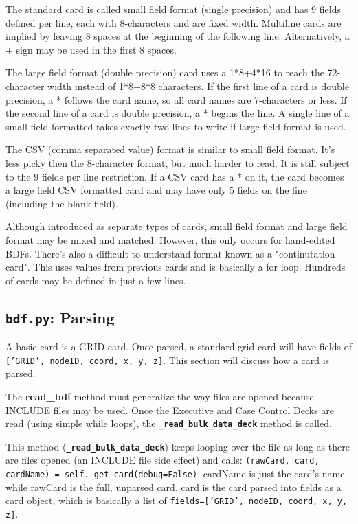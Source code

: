      The standard card is called small field format (single precision) and has 9 fields defined per line, each with 8-characters and are fixed width.  Multiline cards are implied by leaving 8 spaces at the beginning of the following line.  Alternatively, a + sign may be used in the first 8 spaces.

     The large field format (double precision) card uses a 1*8+4*16 to reach the 72-character width instead of 1*8+8*8 characters.  If the first line of a card is double precision, a * follows the card name, so all card names are 7-characters or less.  If the second line of a card is double precision, a * begins the line.  A single line of a small field formatted takes exactly two lines to write if large field format is used.

     The CSV (comma separated value) format is similar to small field format.  It's less picky then the 8-character format, but much harder to read.  It is still subject to the 9 fields per line restriction.  If a CSV card has a * on it, the card becomes a large field CSV formatted card and may have only 5 fields on the line (including the blank field).

     Although introduced as separate types of cards, small field format and large field format may be mixed and matched.  However, this only occurs for hand-edited BDFs.  There's also a difficult to understand format known as a "continutation card".  This uses values from previous cards and is basically a for loop.  Hundreds of cards may be defined in just a few lines.

 \subsection{{\tt bdf.py}: Parsing}
     A basic card is a GRID card.  Once parsed, a standard grid card will have fields of {\tt ['GRID', nodeID, coord, x, y, z]}.  This section will discuss how a card is parsed.

     The {\bf read_bdf} method must generalize the way files are opened because INCLUDE files may be used.  Once the Executive and Case Control Decks are read (using simple while loops), the {\bf \tt \_read\_bulk\_data\_deck} method is called.

     This method ({\bf \tt \_read\_bulk\_data\_deck}) keeps looping over the file as long as there are files opened (an INCLUDE file side effect) and calls:
     {\tt (rawCard, card, cardName) = self.\_get\_card(debug=False)}.  cardName is just the card's name, while rawCard is the full, unparsed card.  card is the card parsed into fields as a card object, which is basically a list of {\tt fields=['GRID', nodeID, coord, x, y, z]}.

